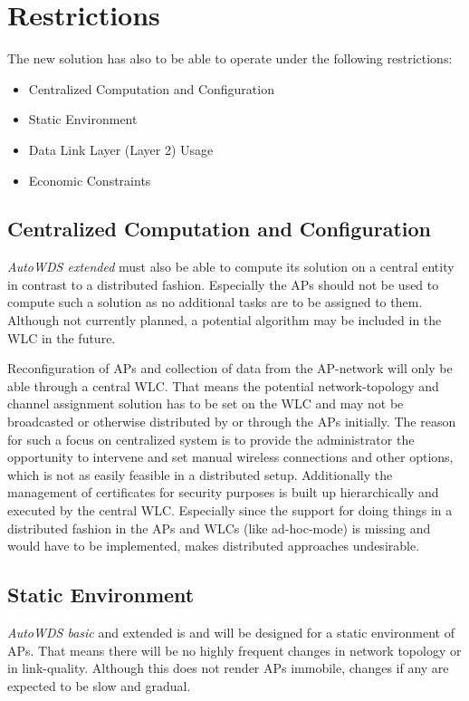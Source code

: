   \section{Restrictions}
    The new solution has also to be able to operate under the following restrictions:
    \begin{itemize}
      \item Centralized Computation and Configuration
      \item Static Environment
      \item Data Link Layer (Layer 2) Usage
      \item Economic Constraints
    \end{itemize}
    
    \subsection{Centralized Computation and Configuration}
      \textit{AutoWDS extended} must also be able to compute its solution on a central entity in contrast to a distributed fashion.
      Especially the APs should not be used to compute such a solution as no additional tasks are to be assigned to them.
      Although not currently planned, a potential algorithm may be included in the \ac{WLC} in the future.
      
      Reconfiguration of APs and collection of data from the \ac{AP}-network will only be able through a central \ac{WLC}.
      That means the potential network-topology and channel assignment solution has to be set on the \ac{WLC} and may not be broadcasted or otherwise
      distributed by or through the APs initially.
      The reason for such a focus on centralized system is to provide the administrator the opportunity to intervene and set manual wireless connections and other options,
      which is not as easily feasible in a distributed setup. 
      Additionally the management of certificates for security purposes is built up hierarchically and executed by the central \ac{WLC}.
      Especially since the support for doing things in a distributed fashion in the APs and WLCs (like ad-hoc-mode) is missing and would have to be implemented, 
      makes distributed approaches undesirable.
      
    \subsection{Static Environment}
      \textit{AutoWDS basic} and extended is and will be designed for a static environment of APs.
      That means there will be no highly frequent changes in network topology or in link-quality.
      Although this does not render APs immobile, changes if any are expected to be slow and gradual.
      
